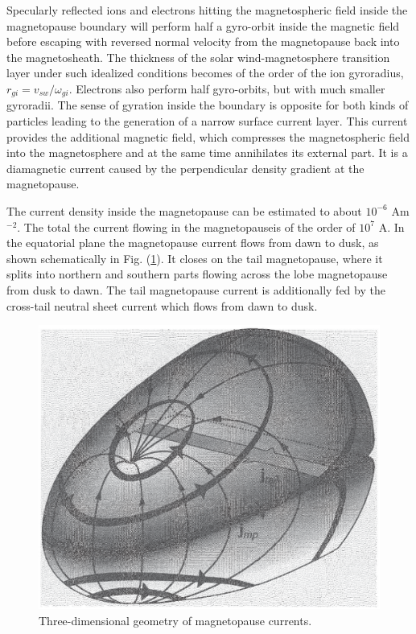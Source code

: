 \documentclass[12pt,a4paper]{article}
\begin{document}
Specularly reflected ions and electrons hitting the magnetospheric field inside the magnetopause boundary will perform half a gyro-orbit inside the magnetic field before escaping with reversed normal velocity from the magnetopause back into the magnetosheath. The thickness of the solar wind-magnetosphere transition layer under such idealized conditions becomes of the order of the ion gyroradius, $r_{gi} = v_{sw}/\omega_{gi}$. Electrons also perform half gyro-orbits, but with much smaller gyroradii. The sense of gyration inside the boundary is opposite for both kinds of particles leading to the generation of a narrow surface current layer. This current provides the additional magnetic field, which compresses the magnetospheric field into the magnetosphere and at the same time annihilates its external part. It is a diamagnetic current caused by the perpendicular density
gradient at the magnetopause. 

The current density inside the magnetopause can be estimated to about $10^{-6}$ Am$^{-2}$. The total the current flowing in the magnetopauseis of the order of $10^7$ A. In the equatorial plane the magnetopause current flows from dawn to dusk, as shown schematically in Fig. (\ref{fig:geo_magnetopause_currents}).  It closes on the tail magnetopause, where it splits into northern and southern parts flowing across the lobe magnetopause from dusk to dawn. The tail magnetopause current is additionally fed by the cross-tail neutral sheet current which flows from dawn to dusk.

\begin{figure}
\centering
\includegraphics[height=10.cm,angle=0]{geo_magnetopause_currents.eps}
\caption{
Three-dimensional geometry of magnetopause currents.
} 
\label{fig:geo_magnetopause_currents}
\end{figure}
\end{document}
